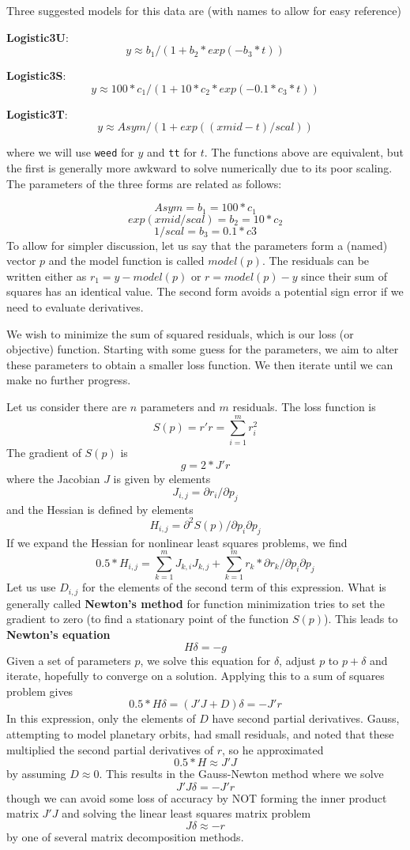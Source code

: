 Three suggested models for this data are (with names to allow for easy reference)

\textbf{Logistic3U}:
\[  y \approx  b_1 / (1 + b_2 * exp(- b_3 * t)) \]

\textbf{Logistic3S}:
\[ y \approx  100 * c_1 / (1 + 10 * c_2 * exp(- 0.1 * c_3 * t)) \]

\textbf{Logistic3T}:
\[ y \approx Asym / (1 + exp((xmid - t)/scal)) \]

where we will use \texttt{weed} for \(y\) and \texttt{tt} for \(t\).
The functions above are equivalent, but the first is generally more awkward
to solve numerically due to its poor scaling. The parameters of the three forms
are related as follows:

\[   Asym =  b_1 = 100 * c_1 \]
\[ exp(xmid/scal)  =  b_2 = 10 * c_2 \]
\[ 1/scal  =  b_3 = 0.1*c3 \]
To allow for simpler discussion, let us say that the parameters form a (named) vector
\(p\) and the model function is called \(model(p)\). The residuals can be written
either as \(r_1 = y - model(p)\) or \(r = model(p) - y\)
since their sum of squares has an identical value. The second form
avoids a potential sign error if we need to evaluate derivatives.

We wish to minimize the sum of squared residuals, which is our loss (or objective) function.
Starting with some guess for the parameters, we aim to alter these parameters to obtain a smaller
loss function. We then iterate until we can make no further progress.

Let us consider there are \(n\) parameters and \(m\) residuals.
The loss function is
\[ S(p) = r' r = \sum_{i=1}^m { r_i^2 }\]
The gradient of \(S(p)\) is
\[ g = 2 * J' r\]
where the Jacobian \(J\) is given by elements
\[ J_{i,j} = \partial r_i / \partial p_j \]
and the Hessian is defined by elements
\[ H_{i,j} = \partial ^2 S(p) / {\partial p_i \partial p_j} \]
If we expand the Hessian for nonlinear least squares problems, we find
\[  0.5 * H_{i,j} = \sum_{k = 1}^m{ J_{k,i} J_{k,j}}  + \sum_{k = 1}^m {r_k * \partial{r_k}/{\partial p_i \partial p_j}}\]
Let us use \(D_{i,j}\) for the elements of the second term of this expression.
What is generally called \textbf{Newton's method} for function minimization tries
to set the gradient to zero (to find a stationary point of the function \(S(p)\)).
This leads to \textbf{Newton's equation}
\[ H \delta = -g \]
Given a set of parameters \(p\), we solve this equation for \(\delta\), adjust \(p\)
to \(p + \delta\) and iterate, hopefully to converge on a solution.
Applying this to a sum of squares problem gives
\[ 0.5 * H \delta = (J'J + D) \delta = - J' r\]
In this expression, only the elements of \(D\) have second partial derivatives.
Gauss, attempting to model planetary orbits, had small residuals, and noted
that these multiplied the second partial derivatives of \(r\), so he approximated
\[ 0.5 * H \approx J' J\]
by assuming \(D \approx 0\). This results in the Gauss-Newton method where we
solve
\[ J' J \delta = - J' r\]
though we can avoid some loss of accuracy by NOT forming the inner product matrix
\(J' J\) and solving the linear least squares matrix problem
\[ J \delta \approx -r \]
by one of several matrix decomposition methods.

